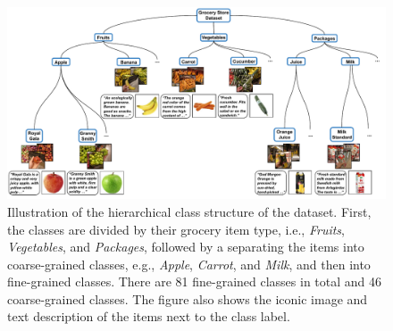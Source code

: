 
\begin{figure}[t]
    \centering
    \includegraphics[width=\textwidth]{PaperB/figures_and_tables/dataset_figures/dataset_figure_new.pdf} %
    \vspace{-2mm}
    \caption{Illustration of the hierarchical class structure of the dataset. First, the classes are divided by their grocery item type, i.e., \textit{Fruits}, \textit{Vegetables}, and \textit{Packages}, followed by a separating the items into coarse-grained classes, e.g., \textit{Apple}, \textit{Carrot}, and \textit{Milk}, and then into fine-grained classes. There are 81 fine-grained classes in total and 46 coarse-grained classes. The figure also shows the iconic image and text description of the items next to the class label.
   }
    \label{fig:examples} 
\end{figure}